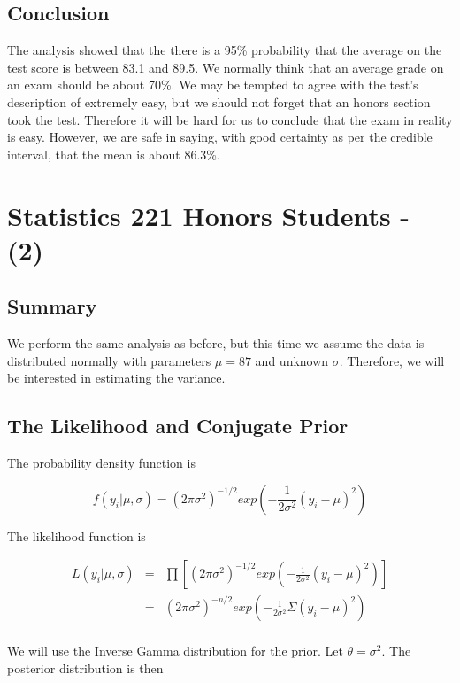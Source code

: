 \documentclass[12pt]{article}
\begin{document}
\subsection{Conclusion}

The analysis showed that the there is a 95\% probability that the average on the test score is between 83.1 and 89.5.  We normally think that an average grade on an exam should be about 70\%.  We may be tempted to agree with the test's description of extremely easy, but we should not forget that an honors section took the test.  Therefore it will be hard for us to conclude that the exam in reality is easy.  However, we are safe in saying, with good certainty as per the credible interval, that the mean is about 86.3\%.

\newpage

\section{Statistics 221 Honors Students - (2)}

\subsection{Summary}

\noindent We perform the same analysis as before, but this time we assume the data is distributed normally with parameters $\mu=87$ and unknown $\sigma$.  Therefore, we will be interested in estimating the variance.

\subsection{The Likelihood and Conjugate Prior}

\noindent The probability density function is

\[f(y_i|\mu,\sigma)=(2\pi\sigma^2)^{-1/2}exp\left(-\frac{1}{2\sigma^2}(y_i-\mu)^2\right)\]

\noindent The likelihood function is

\begin{eqnarray*}
L(y_i|\mu,\sigma) &=& \prod\left[(2\pi\sigma^2)^{-1/2}exp\left(-\frac{1}{2\sigma^2}(y_i-\mu)^2\right)\right] \\
&=& (2\pi\sigma^2)^{-n/2}exp\left(-\frac{1}{2\sigma^2}\Sigma(y_i-\mu)^2\right) \\
\end{eqnarray*}

\noindent We will use the Inverse Gamma distribution for the prior.  Let $\theta=\sigma^2$.  The posterior distribution is then
\end{document}
